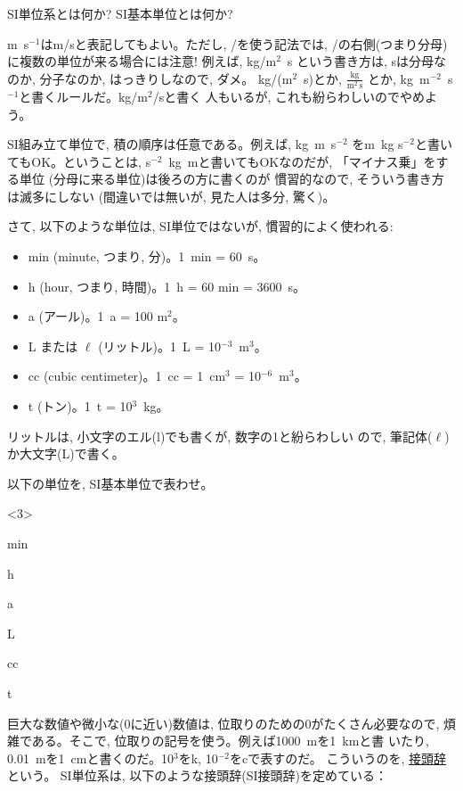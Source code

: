\begin{q}\label{q:SIunit} SI単位系とは何か? SI基本単位とは何か?\end{q}

m~s$^{-1}$はm/sと表記してもよい。ただし, /を使う記法では, /の右側(つまり分母)
に複数の単位が来る場合には注意! 例えば, kg/m$^2$~s という書き方は, 
sは分母なのか, 分子なのか, はっきりしなので, ダメ。
kg/(m$^2$~s)とか, $\frac{\text{kg}}{\text{m}^2\,\text{s}}$
とか, kg~m$^{-2}$~s$^{-1}$と書くルールだ。kg/m$^2$/sと書く
人もいるが, これも紛らわしいのでやめよう。

SI組み立て単位で, 積の順序は任意である。例えば, kg~m~s$^{-2}$
をm~kg s$^{-2}$と書いてもOK。ということは, 
s$^{-2}$~kg~mと書いてもOKなのだが, 
「マイナス乗」をする単位 (分母に来る単位)は後ろの方に書くのが
慣習的なので, そういう書き方は滅多にしない (間違いでは無いが, 
見た人は多分, 驚く)。\mv

さて, 以下のような単位は, SI単位ではないが, 慣習的によく使われる:
\begin{itemize}
\item min (minute, つまり, 分)。1~min = 60~s。
\item h (hour, つまり, 時間)。1~h = 60 min = 3600~s。
\item a (アール)。1~a = 100 m$^2$。
\item L または $\ell$ (リットル)。1~L = 10$^{-3}$~m$^3$。
\item cc (cubic centimeter)。1~cc = 1~cm$^3$ = 10$^{-6}$~m$^3$。
\item t (トン)。1~t = 10$^3$~kg。
\end{itemize}
リットルは, 小文字のエル(l)でも書くが, 数字の1と紛らわしい
ので, 筆記体($\ell$)か大文字(L)で書く。

\begin{q}\label{q:nonSIunit} 以下の単位を, SI基本単位で表わせ。
\begin{edaenumerate}<3>
\item min
\item h
\item a
\item L
\item cc
\item t
\end{edaenumerate}
\end{q}
\mv

巨大な数値や微小な(0に近い)数値は, 位取りのための0がたくさん必要なので, 
煩雑である。そこで, 位取りの記号を使う。例えば1000~mを1~kmと書
いたり, 0.01~mを1~cmと書くのだ。10$^3$をk, 10$^{-2}$をcで表すのだ。
こういうのを, \underline{接頭辞}という。
SI単位系は, 以下のような接頭辞(SI接頭辞)を定めている：

